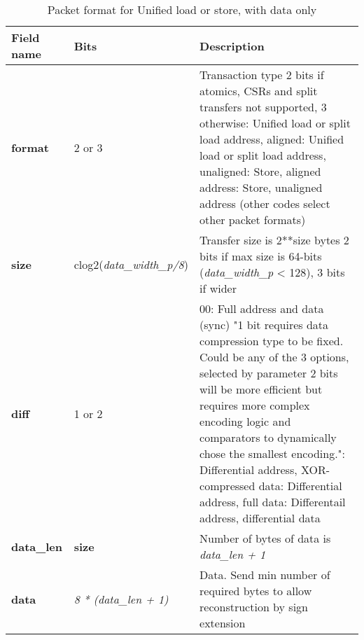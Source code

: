 \begin{table}[htp]
  \centering
  \caption{Packet format for Unified load or store, with data only}
  \label{tab:te_datadx0y2}
  \begin{tabulary}{\textwidth}{|l|p{40mm}|p{90mm}|}
    \hline
    {\bf Field name} & {\bf Bits} & {\bf Description} \\
    \hline
    \textbf{format} & 	2 or 3	& Transaction type	2 bits if atomics, CSRs and split transfers not supported, 3 otherwise: Unified load or split load address, aligned: Unified load or split load address, unaligned: Store, aligned address: Store, unaligned address\newline
		(other codes select other packet formats)\\
    \hline
    \textbf{size} & clog2(\textit{data\_width\_p/8}) & Transfer size is 2**size bytes	2 bits if max size is 64-bits (\textit{data\_width\_p} < 128), 3 bits if wider \\
    \hline
    \textbf{diff} & 1 or 2 & 00: Full address and data (sync)	"1 bit requires data compression type to be fixed.  Could be any of the 3 options, selected by parameter
    2 bits will be more efficient but requires more complex encoding logic and comparators to dynamically chose the smallest encoding.":  Differential address, XOR-compressed data: Differential address, full data: Differentail address, differential data\\
    \hline
   \textbf{data\_len}	& \textbf{size} & Number of bytes of data is \textit {data\_len + 1}	\\
    \hline
    \textbf{data} & \textit {8 * (data\_len + 1)} & 
                Data. Send min number of required bytes to allow reconstruction by sign extension\\
    \hline
  \end{tabulary}
\end{table}


